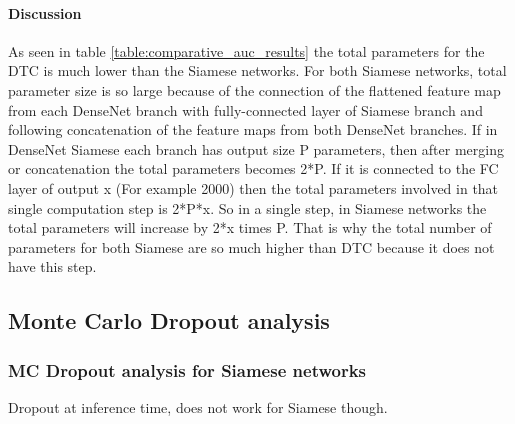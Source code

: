 \paragraph{Discussion }
As seen in table \ref{table:comparative_auc_results} the total parameters for the DTC is much lower than the Siamese networks. For both Siamese networks, total parameter size is so large because of the connection of the flattened 
feature map from each DenseNet branch with fully-connected layer of Siamese branch and following concatenation of the feature maps from both DenseNet branches. If in DenseNet Siamese each branch has output size P parameters, 
then after merging or concatenation the total parameters becomes 2*P. If it is connected to the FC layer of output x (For example 2000) then the total parameters involved in that single computation step is 2*P*x. 
So in a single step, in Siamese networks the total parameters will increase by 2*x times P. 
That is why the total number of parameters for both Siamese are so much higher than DTC because it does not have this step.
\newpage
\subsection{Monte Carlo Dropout analysis}

\subsubsection{MC Dropout analysis for Siamese networks}
Dropout at inference time, does not work for Siamese though.

